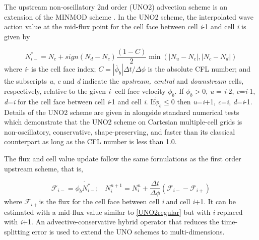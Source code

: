 
\vspace{\baselineskip} 


\noindent
\noindent

The upstream non-oscillatory 2nd order (UNO2) advection scheme \citep{art:Li08} is an extension of the MINMOD scheme \citep{bk:Roe85}. In the UNO2
scheme, the interpolated wave action value at the mid-flux point for
the cell face between cell \emph{i}-1 and cell \emph{i} is given by

\begin{equation}
N_{i-}^{*}=N_{c}+sign\left(N_{d}-N_{c}\right)\frac{\left(1-C\right)}{2}\min\left(|N_{u}-N_{c}|,|N_{c}-N_{d}|\right)
\label{eq:UNO2regular}
\end{equation}
where \emph{i}- is the cell face index; $C=\left|\dot{\phi_{b}}\right|\Delta t/\Delta\phi$ is the absolute CFL number; and the subscripts \emph{u}, \emph{c} and
\emph{d} indicate the \emph{upstream, central} and \emph{downstream}
cells, respectively, relative to the given \emph{i}- cell face velocity
$\dot{\phi}_{b}$. If $\dot{\phi}_{b}>0$, \emph{u} = \emph{i}-2,
\emph{c}=\emph{i}-1, \emph{d}=\emph{i} for the cell face between cell
\emph{i}-1 and cell \emph{i}. If$\dot{\phi}_{b}\leq0$ then \emph{u}=\emph{i}+1,
\emph{c}=\emph{i}, \emph{d}=\emph{i}-1. Details of the UNO2 scheme
are given in \cite{art:Li08} alongside standard numerical tests which demonstrate
that the UNO2 scheme on Cartesian multiple-cell grids is non-oscillatory,
conservative, shape-preserving, and faster than its classical counterpart
as long as the CFL number is less than 1.0.

The flux and cell value update follow the same fornulations as the
first order upstream scheme, that is,

\[
\mathcal{F}_{i-}=\dot{\phi_{b}N_{i-}^{*}};\;\;\; N_{i}^{n+1}=N_{i}^{n}+\frac{\Delta t}{\Delta\phi}\left(\mathcal{F}_{i-}-\mathcal{F}_{i+}\right)\]
 where $\mathcal{F}_{i+}$is the flux for the cell face between cell\emph{
i} and cell \emph{i}+1. It can be estimated with a mid-flux value
similar to \ref{UNO2regular} but with \emph{i} replaced with \emph{i}+1.
An advective-conservative hybrid operator \citep{art:LLM96} that
reduces the time-splitting error is used to extend the UNO schemes
to multi-dimensions. 

